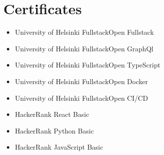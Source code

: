 \section{Certificates}

\begin{itemize}
	\item University of Helsinki FullstackOpen Fullstack
	\item University of Helsinki FullstackOpen GraphQl
	\item University of Helsinki FullstackOpen TypeScript
	\item University of Helsinki FullstackOpen Docker
	\item University of Helsinki FullstackOpen CI/CD
	\item HackerRank React Basic
	\item HackerRank Python Basic
	\item HackerRank JavaScript Basic
\end{itemize}
